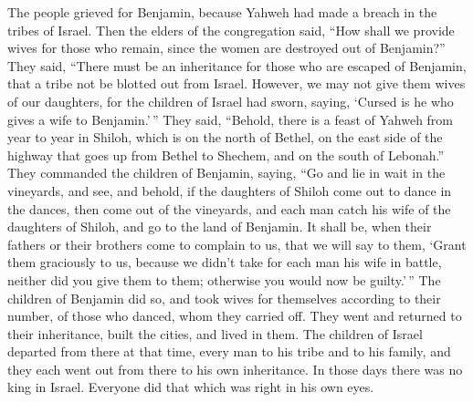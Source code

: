  The people grieved for Benjamin, because Yahweh had made
a breach in the tribes of Israel.  Then the elders of the
congregation said, ``How shall we provide wives for those who remain,
since the women are destroyed out of Benjamin?''  They
said, ``There must be an inheritance for those who are escaped of
Benjamin, that a tribe not be blotted out from Israel. 
However, we may not give them wives of our daughters, for the children
of Israel had sworn, saying, `Cursed is he who gives a wife to
Benjamin.'\,''  They said, ``Behold, there is a feast of
Yahweh from year to year in Shiloh, which is on the north of Bethel, on
the east side of the highway that goes up from Bethel to Shechem, and on
the south of Lebonah.''  They commanded the children of
Benjamin, saying, ``Go and lie in wait in the vineyards, 
and see, and behold, if the daughters of Shiloh come out to dance in the
dances, then come out of the vineyards, and each man catch his wife of
the daughters of Shiloh, and go to the land of Benjamin. 
It shall be, when their fathers or their brothers come to complain to
us, that we will say to them, `Grant them graciously to us, because we
didn't take for each man his wife in battle, neither did you give them
to them; otherwise you would now be guilty.'\,''  The
children of Benjamin did so, and took wives for themselves according to
their number, of those who danced, whom they carried off. They went and
returned to their inheritance, built the cities, and lived in them.
 The children of Israel departed from there at that time,
every man to his tribe and to his family, and they each went out from
there to his own inheritance.  In those days there was no
king in Israel. Everyone did that which was right in his own eyes.
